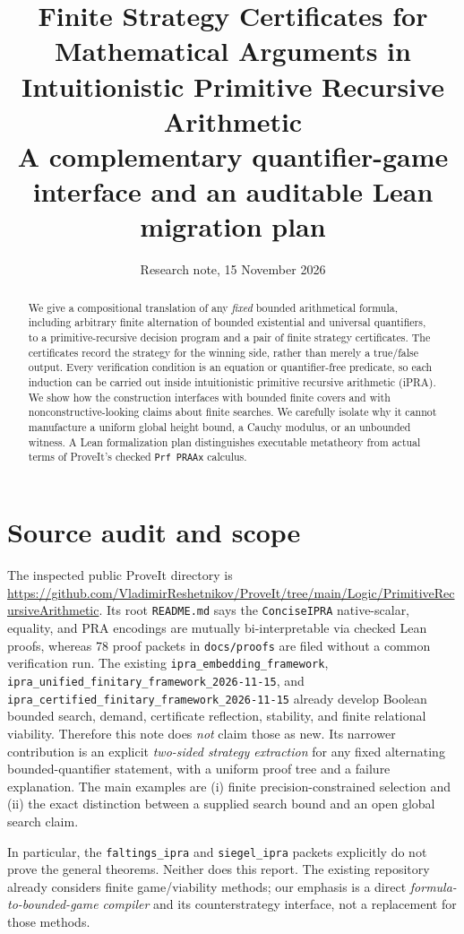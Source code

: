 \documentclass[11pt]{article}
\title{Finite Strategy Certificates for Mathematical Arguments in Intuitionistic Primitive Recursive Arithmetic\\\large A complementary quantifier-game interface and an auditable Lean migration plan}
\author{Research note, 15 November 2026}
\date{}
\begin{document}
\maketitle
\begin{abstract}
We give a compositional translation of any \emph{fixed} bounded arithmetical formula, including arbitrary finite alternation of bounded existential and universal quantifiers, to a primitive-recursive decision program and a pair of finite strategy certificates. The certificates record the strategy for the winning side, rather than merely a true/false output. Every verification condition is an equation or quantifier-free predicate, so each induction can be carried out inside intuitionistic primitive recursive arithmetic (iPRA). We show how the construction interfaces with bounded finite covers and with nonconstructive-looking claims about finite searches. We carefully isolate why it cannot manufacture a uniform global height bound, a Cauchy modulus, or an unbounded witness. A Lean formalization plan distinguishes executable metatheory from actual terms of ProveIt's checked \texttt{Prf PRAAx} calculus.
\end{abstract}
\tableofcontents
\section{Source audit and scope}
The inspected public ProveIt directory is \url{https://github.com/VladimirReshetnikov/ProveIt/tree/main/Logic/PrimitiveRecursiveArithmetic}. Its root \texttt{README.md} says the \texttt{ConciseIPRA} native-scalar, equality, and PRA encodings are mutually bi-interpretable via checked Lean proofs, whereas 78 proof packets in \texttt{docs/proofs} are filed without a common verification run. The existing \texttt{ipra\_embedding\_framework}, \texttt{ipra\_unified\_finitary\_framework\_2026-11-15}, and \texttt{ipra\_certified\_finitary\_framework\_2026-11-15} already develop Boolean bounded search, demand, certificate reflection, stability, and finite relational viability. Therefore this note does \emph{not} claim those as new. Its narrower contribution is an explicit \emph{two-sided strategy extraction} for any fixed alternating bounded-quantifier statement, with a uniform proof tree and a failure explanation. The main examples are (i) finite precision-constrained selection and (ii) the exact distinction between a supplied search bound and an open global search claim.

In particular, the \texttt{faltings\_ipra} and \texttt{siegel\_ipra} packets explicitly do not prove the general theorems. Neither does this report. The existing repository already considers finite game/viability methods; our emphasis is a direct \emph{formula-to-bounded-game compiler} and its counterstrategy interface, not a replacement for those methods.
\end{document}
